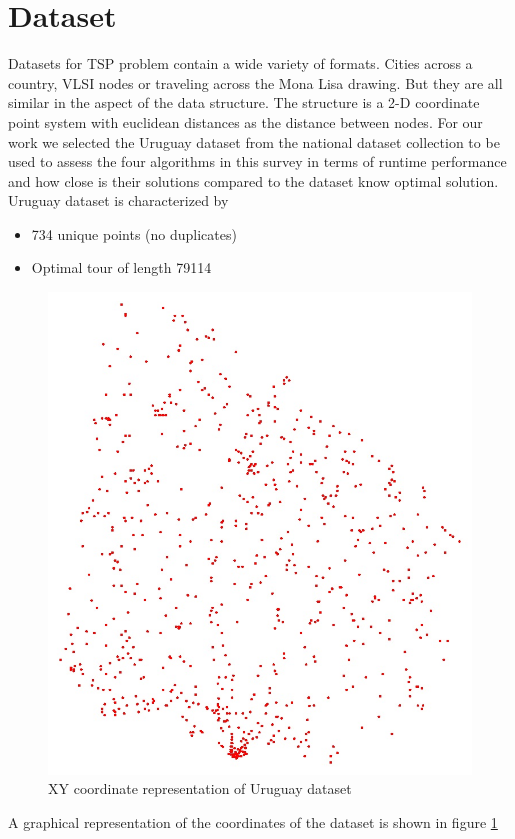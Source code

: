 \documentclass[twocolumn]{article}
\begin{document}
	\section{Dataset}
	Datasets for TSP problem contain a wide variety of formats. Cities across a country, VLSI nodes or traveling across the Mona Lisa drawing. But they are all similar in the aspect of the data structure. The structure is a 2-D coordinate point system with euclidean distances as the distance between nodes.
	For our work we selected the Uruguay dataset from the national dataset collection\cite{UY734} to be used to assess the four algorithms in this survey in terms of runtime performance and how close is their solutions compared to the dataset know optimal solution. Uruguay dataset is characterized by 
	\begin{itemize}
		\item 734 unique points (no duplicates)
		\item Optimal tour of length 79114
	\end{itemize}
	\begin{figure}[h!]
		\centering
		\includegraphics[scale=0.3]{./uypoints.jpg}
		\caption{XY coordinate representation of Uruguay dataset}
		\label{fig:uruguay}
	\end{figure}
	A graphical representation of the coordinates of the dataset is shown in figure \ref{fig:uruguay}
	
\end{document}
